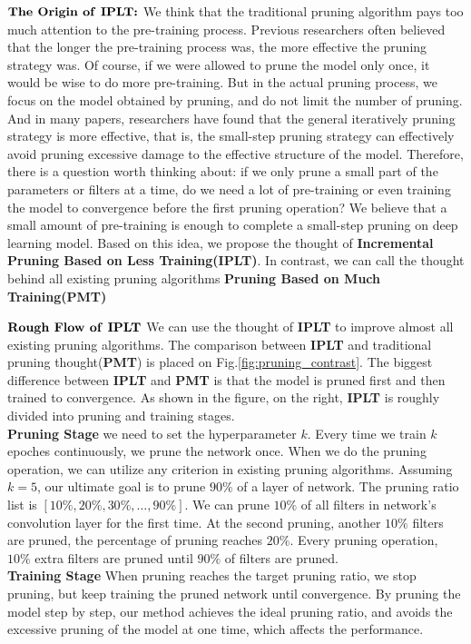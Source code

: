 \documentclass[runningheads]{llncs}
\begin{document}
$\textbf{The Origin of \textbf{IPLT}:}$
We think that the traditional pruning algorithm pays too much attention to the pre-training process. Previous researchers often believed that the longer the pre-training process was, the more effective the pruning strategy was. Of course, if we were allowed to prune the model only once, it would be wise to do more pre-training. But in the actual pruning process, we focus on the model obtained by pruning, and do not limit the number of pruning.  And in many papers, researchers have found that the general iteratively pruning strategy is more effective, that is, the small-step pruning strategy can effectively avoid pruning excessive damage to the effective structure of the model. Therefore, there is a question worth thinking about: if we only prune a small part of the parameters or filters at a time, do we need a lot of pre-training or even training the model to convergence before the first pruning operation? We believe that a small amount of pre-training is enough to complete a small-step pruning on deep learning model. Based on this idea, we propose the thought of \textbf{Incremental Pruning Based on Less Training(IPLT)}. In contrast, we can call the thought behind all existing pruning algorithms \textbf{Pruning Based on Much Training(PMT)}



$\textbf{Rough Flow of \textbf{IPLT}}$
We can use the thought of \textbf{IPLT} to improve almost all existing pruning algorithms.
The comparison between \textbf{IPLT} and traditional pruning thought(\textbf{PMT}) is placed on Fig.\ref{fig:pruning_contrast}. The biggest difference between \textbf{IPLT} and \textbf{PMT} is that the model is pruned first and then trained to convergence. As shown in the figure, on the right, \textbf{IPLT} is roughly divided into pruning and training stages.\\
\textbf{Pruning Stage} \quad we need to set the hyperparameter $k$. Every time we train $k$ epoches continuously, we prune the network once. When we do the pruning operation, we can utilize any criterion in existing pruning algorithms. Assuming $k=5$, our ultimate goal is to prune $90\%$ of a layer of network. The pruning ratio list is $[10\%,20\%,30\%, \dots,90\%]$. We can prune $10\%$ of all filters in network's convolution layer for the first time. At the second pruning, another $10\%$ filters are pruned, the percentage of pruning reaches $20\%$. Every pruning operation, $10\%$ extra filters are pruned until $90\%$ of filters are pruned. \\
\textbf{Training Stage} \quad When pruning reaches the target pruning ratio, we stop pruning, but keep training the pruned network until convergence.
By pruning the model step by step, our method achieves the ideal pruning ratio, and avoids the excessive pruning of the model at one time, which affects the performance.
\end{document}

